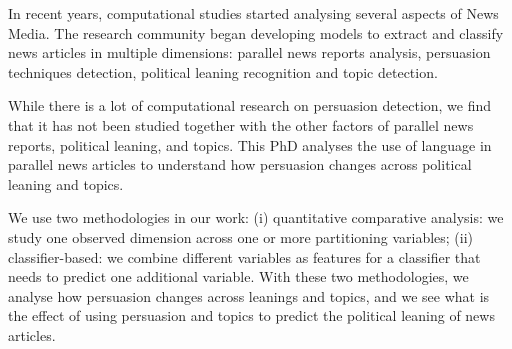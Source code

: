 In recent years, computational studies started analysing several aspects of News Media.
The research community began
developing models to extract and classify news articles in multiple dimensions: parallel news reports analysis, persuasion techniques detection, political leaning recognition and topic detection.

While there is a lot of computational research on persuasion detection, we find that it has not been studied together with the other factors of 
parallel news reports, political leaning, and topics.
%
%
This PhD analyses the use of language in parallel news articles to understand how persuasion changes across political leaning and topics.


We use two methodologies in our work:
(i) quantitative comparative analysis: we study one observed dimension across one or more partitioning variables;
(ii) classifier-based: we combine different variables as features for a classifier that needs to predict one additional variable.
With these two methodologies, we analyse how persuasion changes across leanings and topics, and we see what is the effect of using persuasion and topics to predict the political leaning of news articles. 


